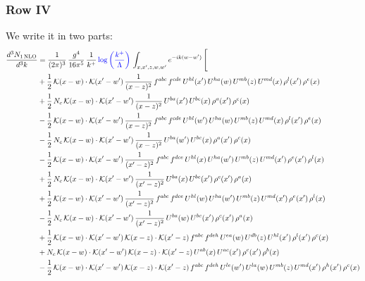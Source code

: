 \documentclass[9pt]{article}
\numberwithin{equation}{section}
\begin{document}
\subsubsection{Row IV}
We write it in two parts: 
\begin{align}
\frac{d^{3}N_{1\,\mathrm{NLO}}}{d^{3}k} & = \frac{1}{(2\pi)^{3}}\,\frac{g^{4}}{16\pi^{5}}\,\frac{1}{k^{+}}\,{\color{blue}\log{\left(\frac{k^{+}}{\Lambda}\right)}}\,\int_{x,x',z,w,w'}e^{-ik(w-w')}\,\Bigg[\notag\\ & 
 +\frac{1}{2}\,\mathcal{K}(x-w)\cdot\mathcal{K}(x'-w')\,\frac{1}{(x-z)^{2}}\,f^{abc}\,f^{cde}\,U^{hl}(x')\,U^{ha}(w)\,U^{mb}(z)\,U^{md}(x)\,\rho^{l}(x')\,\rho^{e}(x)\notag\\
& +\frac{1}{2}\,N_{c}\,\mathcal{K}(x-w)\cdot\mathcal{K}(x'-w')\,\frac{1}{(x-z)^{2}}\,U^{ba}(x')\,U^{bc}(x)\,\rho^{a}(x')\,\rho^{c}(x)\notag\\
& -\frac{1}{2}\,\mathcal{K}(x-w)\cdot\mathcal{K}(x'-w')\,\frac{1}{(x-z)^{2}}\,f^{abc}\,f^{cde}\,U^{hl}(w')\,U^{ha}(w)\,U^{mb}(z)\,U^{md}(x)\,\rho^{l}(x')\,\rho^{e}(x)\notag\\
& -\frac{1}{2}\,N_{c}\,\mathcal{K}(x-w)\cdot\mathcal{K}(x'-w')\,\frac{1}{(x-z)^{2}}\,U^{ba}(w')\,U^{bc}(x)\,\rho^{a}(x')\,\rho^{c}(x)\notag\\
& -\frac{1}{2}\,\mathcal{K}(x-w)\cdot\mathcal{K}(x'-w')\,\frac{1}{(x'-z)^{2}}\,f^{abc}\,f^{dce}\,U^{hl}(x)\,U^{ha}(w')\,U^{mb}(z)\,U^{md}(x')\,\rho^{e}(x')\,\rho^{l}(x)\notag\\
& +\frac{1}{2}\,N_{c}\,\mathcal{K}(x-w)\cdot\mathcal{K}(x'-w')\,\frac{1}{(x'-z)^{2}}\,U^{ba}(x)\,U^{bc}(x')\,\rho^{c}(x')\,\rho^{a}(x)\notag\\
& +\frac{1}{2}\,\mathcal{K}(x-w)\cdot\mathcal{K}(x'-w')\,\frac{1}{(x'-z)^{2}}\,f^{abc}\,f^{dce}\,U^{hl}(w)\,U^{ha}(w')\,U^{mb}(z)\,U^{md}(x')\,\rho^{e}(x')\,\rho^{l}(x)\notag\\
& -\frac{1}{2}\,N_{c}\,\mathcal{K}(x-w)\cdot\mathcal{K}(x'-w')\,\frac{1}{(x'-z)^{2}}\,U^{ba}(w)\,U^{bc}(x')\,\rho^{c}(x')\,\rho^{a}(x)\notag\\
& +\frac{1}{2}\,\mathcal{K}(x-w)\cdot\mathcal{K}(x'-w')\,\mathcal{K}(x-z)\cdot\mathcal{K}(x'-z)\,f^{abc}\,f^{deh}\,U^{ea}(w)\,U^{db}(z)\,U^{hl}(x')\,\rho^{l}(x')\,\rho^{c}(x)\notag\\
& +N_{c}\,\mathcal{K}(x-w)\cdot\mathcal{K}(x'-w')\,\mathcal{K}(x-z)\cdot\mathcal{K}(x'-z)\,U^{ab}(x)\,U^{ac}(x')\,\rho^{c}(x')\,\rho^{b}(x)\notag\\
& -\frac{1}{2}\,\mathcal{K}(x-w)\cdot\mathcal{K}(x'-w')\,\mathcal{K}(x-z)\cdot\mathcal{K}(x'-z)\,f^{abc}\,f^{deh}\,U^{le}(w')\,U^{la}(w)\,U^{mb}(z)\,U^{md}(x')\,\rho^{h}(x')\,\rho^{c}(x)\notag\\

\end{align}
\end{document}
